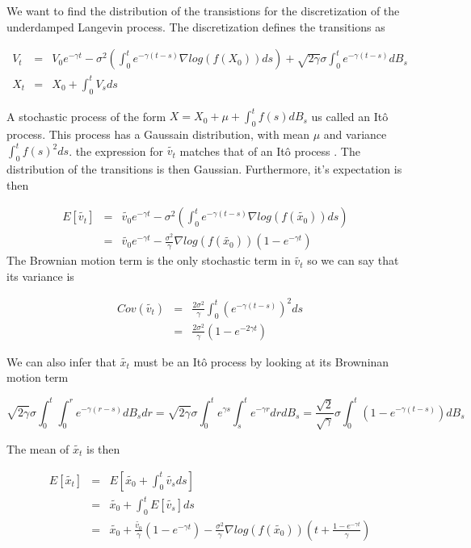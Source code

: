 \chapter{}
\label{Appendix B}

We want to find the distribution of the transistions for the discretization of the underdamped Langevin process. The discretization defines the transitions as 

$$
\begin{array}{lcl} V_t & = & V_0 e^{-\gamma t}-\sigma^2(\int_0^t e^{-\gamma(t-s)}\nabla log(f(X_0))ds) + \sqrt{2\gamma}\sigma \int_0^t e^{-\gamma(t-s)} dB_s \\
X_t & = & X_0 + \int_0^t V_s ds \end{array}
$$

A stochastic process of the form $X = X_0 + \mu + \int_0^tf(s)dB_s$ us called an Itô process. This process has a Gaussain distribution, with mean $\mu$ and variance $\int_0^tf(s)^2ds$\cite{iacus_simulation_2008}. the expression for $\tilde{v_t}$ matches that of an Itô process . The distribution of the transitions is then Gaussian. Furthermore, it's expectation is then

$$
\begin{array}{lcl}
     E[\tilde{v_t}] & = & \tilde{v_0} e^{-\gamma t} - \sigma^2(\int_0^t e^{-\gamma(t-s)}\nabla log(f(\tilde{x_0}))ds) & \\
     & = & \tilde{v_0} e^{-\gamma t} - \frac{\sigma^2}{\gamma} \nabla log(f(\tilde{x_0})) (1-e^{-\gamma t})
\end{array}
$$
The Brownian motion term is the only stochastic term in $\tilde{v_t}$ so we can say that its variance is

$$
\begin{array}{lcl}
    Cov(\tilde{v_t}) & = & \frac{2\sigma^2}{\gamma}\int_0^t (e^{-\gamma (t-s)})^2ds \\
    & = & \frac{2\sigma^2}{\gamma} (1-e^{-2\gamma t})
\end{array}
$$

We can also infer that $\tilde{x_t}$ must be an Itô process by looking at its Browninan motion term

$$
\sqrt{2\gamma}\sigma \int_0^t \int_0^r e^{-\gamma (r-s)}dB_sdr = \sqrt{2\gamma}\sigma \int_0^te^{\gamma s} \int_s^t e^{-\gamma r}drdB_s =  \frac{\sqrt{2}}{\sqrt{\gamma}} \sigma \int_0^t(1-e^{-\gamma(t-s)})dB_s
$$

The mean of $\tilde{x_t}$ is then 
 
$$
\begin{array}{lcl}
E[\tilde{x_t}] & = & E[\tilde{x_0} + \int_0^t \tilde{v_s} ds] \\ & = & \tilde{x_0} + \int_0^t E[\tilde{v_s}] ds \\
& = & \tilde{x_0} + \frac{\tilde{v_0}}{\gamma}(1-e^{-\gamma t}) - \frac{\sigma^2}{\gamma} \nabla log(f(\tilde{x_0}))(t + \frac{1-e^{-\gamma t}}{\gamma})
\end{array}
$$

